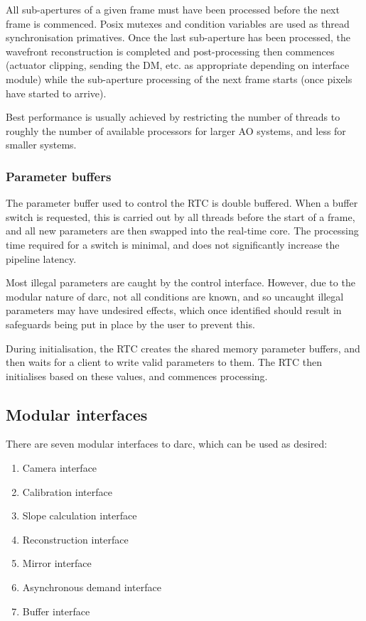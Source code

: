 \documentclass[a4,10pt]{article}
\begin{document}
All sub-apertures of a given frame must have been processed before the
next frame is commenced.  Posix mutexes and condition variables are
used as thread synchronisation primatives.  Once the last sub-aperture
has been processed, the wavefront reconstruction is completed and
post-processing then commences (actuator clipping, sending the DM,
etc. as appropriate depending on interface module) while the
sub-aperture processing of the next frame starts (once pixels have
started to arrive).

Best performance is usually achieved by restricting the number of
threads to roughly the number of available processors for larger AO
systems, and less for smaller systems.

\subsubsection{Parameter buffers}
The parameter buffer used to control the RTC is double buffered.  When
a buffer switch is requested, this is carried out by all threads
before the start of a frame, and all new parameters are then swapped
into the real-time core.  The processing time required for a
switch is minimal, and does not significantly increase the
pipeline latency.

Most illegal parameters are caught by the control interface.  However,
due to the modular nature of darc, not all conditions are known, and
so uncaught illegal parameters may have undesired effects, which once
identified should result in safeguards being put in place by the user
to prevent this.

During initialisation, the RTC creates the shared memory parameter
buffers, and then waits for a client to write valid parameters to
them.  The RTC then initialises based on these values, and
commences processing.

\subsection{Modular interfaces}
There are seven modular interfaces to darc, which can be used as
desired:
\begin{enumerate}
\item Camera interface
\item Calibration interface
\item Slope calculation interface
\item Reconstruction interface
\item Mirror interface
\item Asynchronous demand interface
\item Buffer interface
\end{enumerate}
\end{document}

